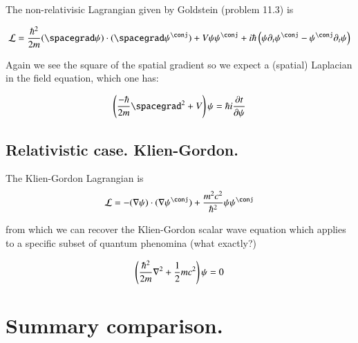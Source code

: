 \documentclass{article}
\begin{document}
The non-relativisic Lagrangian given by Goldstein (problem 11.3) is

\begin{align}
\LL = \frac{\hbar^2}{2m}
(\spacegrad \psi) \cdot (\spacegrad \psi^\conj) + V \psi \psi^\conj + {i \hbar} \left( \psi \partial_t \psi^\conj - \psi^\conj \partial_t \psi \right)
\end{align}

Again we see the square of the spatial gradient so we expect a (spatial) Laplacian
in the field equation, which one has:

\begin{align*}
\left( \frac{-\hbar}{2m} \spacegrad^2 + V \right) \psi = \hbar i \PD{t}{\psi}
\end{align*}

\subsection{ Relativistic case. Klien-Gordon. }

The Klien-Gordon Lagrangian is
\begin{align*}
\LL 
&= -(\grad \psi) \cdot (\grad \psi^\conj) + \frac{m^2 c^2}{\hbar^2} \psi \psi^\conj \\
\end{align*}

from which we can recover the Klien-Gordon scalar wave equation which applies to a
specific subset of quantum phenomina (what exactly?)

\begin{align*}
\left(\frac{\hbar^2}{2m} \nabla^2 + \frac{1}{2} m c^2\right) \psi = 0 \\
\end{align*}

\section{ Summary comparison. }
\end{document}
